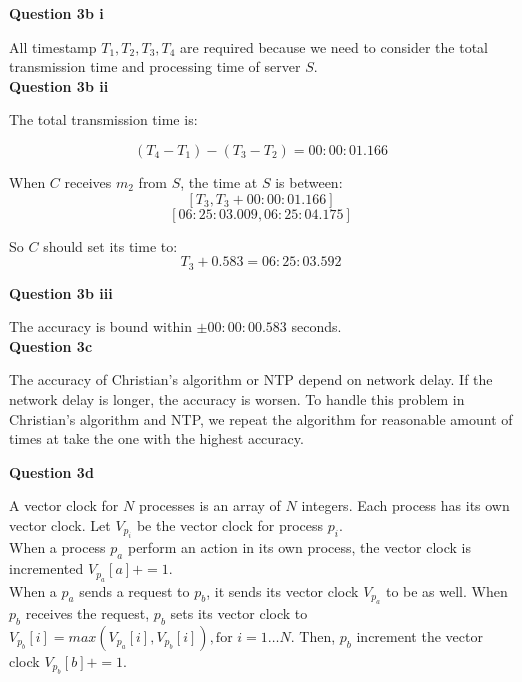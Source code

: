 \documentclass[11pt,a4paper]{report}
\begin{document}
\begin{multicols*}{2}
\noindent \textbf{Question 3b i}

\noindent All timestamp $T_1,T_2,T_3,T_4$ are required because we need to consider the total transmission time and processing time of server $S$.\\

\noindent \textbf{Question 3b ii}

\noindent The total transmission time is:

$$(T_4 - T_1) - (T_3 - T_2) = 00:00:01.166$$

\noindent When $C$ receives $m_2$ from $S$, the time at $S$ is between: 
$$[T_3, T_3 + 00:00:01.166]$$
$$[06:25:03.009, 06:25:04.175]$$

\noindent So $C$ should set its time to:
$$T_3 + 0.583 = 06:25:03.592$$

\noindent \textbf{Question 3b iii}

\noindent The accuracy is bound within $\pm 00:00:00.583$ seconds.\\

\noindent \textbf{Question 3c}

\noindent The accuracy of Christian's algorithm or NTP depend on network delay. If the network delay is longer, the accuracy is worsen. To handle this problem in Christian's algorithm and NTP, we repeat the algorithm for reasonable amount of times at take the one with the highest accuracy.

\noindent \textbf{Question 3d}

\noindent A vector clock for $N$ processes is an array of $N$ integers. Each process has its own vector clock. Let $V_{p_i}$ be the vector clock for process $p_i$.\\

\noindent When a process $p_a$ perform an action in its own process, the vector clock is incremented $V_{p_a}[a] += 1$.\\

\noindent When a $p_a$ sends a request to $p_b$, it sends its vector clock $V_{p_a}$ to be as well. When $p_b$ receives the request, $p_b$ sets its vector clock to $V_{p_b}[i] = max(V_{p_a}[i], V_{p_b}[i]), \text{for } i=1\ldots N$. Then, $p_b$ increment the vector clock $V_{p_b}[b] += 1$.

\end{multicols*}
\end{document}
